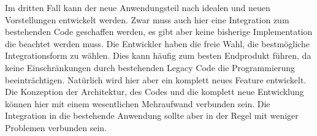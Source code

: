 Im dritten Fall kann der neue Anwendungsteil nach idealen und neuen Vorstellungen entwickelt werden. Zwar muss auch hier eine Integration zum bestehenden Code geschaffen werden, es gibt aber keine bisherige Implementation die beachtet werden muss. Die Entwickler haben die freie Wahl, die bestmögliche Integrationsform zu wählen. Dies kann häufig zum besten Endprodukt führen, da keine Einschränkungen durch bestehenden Legacy Code die Programmierung beeinträchtigen. Natürlich wird hier aber ein komplett neues Feature entwickelt. Die Konzeption der Architektur, des Codes und die komplett neue Entwicklung können hier mit einem wesentlichen Mehraufwand verbunden sein. Die Integration in die bestehende Anwendung sollte aber in der Regel mit weniger Problemen verbunden sein.